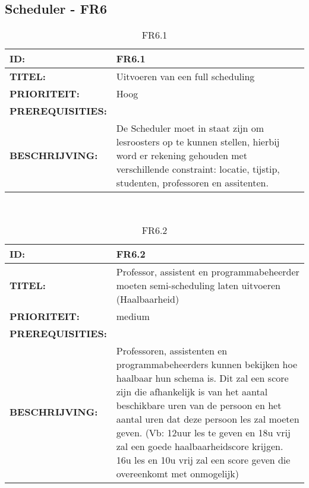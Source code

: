 \subsection{Scheduler - FR6}

\noindent\begin{table}[h]
            \begin{tabular}{l | p{10cm}}
                \textbf{ID:} & FR6.1 \\ \hline
                \textbf{TITEL:} & Uitvoeren van een full scheduling\\ \hline
                \textbf{PRIORITEIT:} &  Hoog \\ \hline
                \textbf{PREREQUISITIES:} & \\ \hline
                \textbf{BESCHRIJVING:} & De Scheduler moet in staat zijn om lesroosters op te kunnen stellen, hierbij word er rekening gehouden met verschillende constraint: locatie, tijstip, studenten, professoren en assitenten. \\
            \end{tabular}\\
            \caption{FR6.1}
            \label{tab:FR6.1}
        \end{table}

\noindent\begin{table}[h]
            \begin{tabular}{l | p{10cm}}
                \textbf{ID:} & FR6.2 \\ \hline
                \textbf{TITEL:} & Professor, assistent en programmabeheerder moeten semi-scheduling laten uitvoeren (Haalbaarheid)\\ \hline
                \textbf{PRIORITEIT:} &  medium \\ \hline
                \textbf{PREREQUISITIES:} & \\ \hline
                \textbf{BESCHRIJVING:} & Professoren, assistenten en programmabeheerders kunnen bekijken hoe haalbaar hun schema is. Dit zal een score zijn die afhankelijk is van het aantal beschikbare uren van de persoon en het aantal uren dat deze persoon les zal moeten geven. (Vb: 12uur les te geven en 18u vrij zal een goede haalbaarheidscore krijgen. 16u les en 10u vrij zal een score geven die overeenkomt met onmogelijk)\\
            \end{tabular}\\
            \caption{FR6.2}
            \label{tab:FR6.2}
        \end{table}
        

